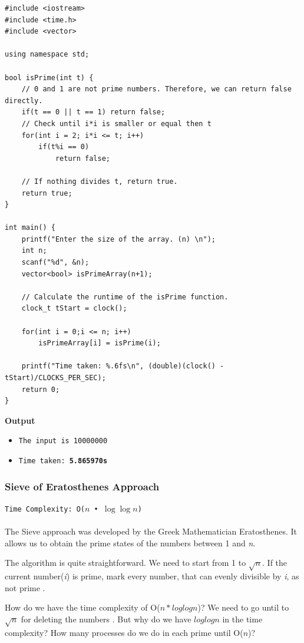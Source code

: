 \documentclass[12pt]{article}
\begin{document}
\clearpage
\begin{verbatim}
#include <iostream>
#include <time.h>
#include <vector>

using namespace std;

bool isPrime(int t) {
    // 0 and 1 are not prime numbers. Therefore, we can return false directly.
    if(t == 0 || t == 1) return false;
    // Check until i*i is smaller or equal then t
    for(int i = 2; i*i <= t; i++)
        if(t%i == 0)
            return false;
    
    // If nothing divides t, return true.
    return true;
}

int main() {
    printf("Enter the size of the array. (n) \n");
    int n;
    scanf("%d", &n);
    vector<bool> isPrimeArray(n+1);
    
    // Calculate the runtime of the isPrime function.
    clock_t tStart = clock();
    
    for(int i = 0;i <= n; i++)
        isPrimeArray[i] = isPrime(i);
    
    printf("Time taken: %.6fs\n", (double)(clock() - tStart)/CLOCKS_PER_SEC);
    return 0;
}
\end{verbatim}
\textbf{Output}
\begin{itemize}
  \item \texttt{The input is 10000000} 
  \item \texttt{Time taken: \textbf{5.865970s}} 
\end{itemize}

\clearpage
\subsubsection{Sieve of Eratosthenes Approach }
\texttt{Time Complexity: O($n$ • $\log{\log{n}}$) } \\ \\
The Sieve approach was developed by the Greek Mathematician Eratosthenes.  It allows us to obtain the prime states of the numbers between 1 and \textit{n}. 

The algorithm is quite straightforward. We need to start from 1 to $ \sqrt{n} $. If the current number(\textit{i}) is prime, mark every number, that can evenly divisible by \textit{i},  as not prime \cite{sieveprimenumber}.

How do we have the time complexity of O($n*loglogn$)? We need to go until to $\sqrt{n}$ for deleting the numbers \cite{sievecodility}. But why do we have $loglogn$ in the time complexity? How many processes do we do in each prime until O($n$)?\
\end{document}
